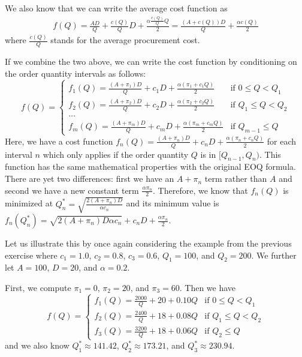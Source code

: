 \begin{solution}
We also know that we can write the average cost function as 
\begin{align*}
f(Q) = \frac{AD}{Q} + \frac{c(Q)}{Q} D + \frac{\alpha \frac{c(Q)}{Q}Q}{2} = \frac{(A+c(Q))D}{Q} + \frac{\alpha c(Q)}{2} 
\end{align*}
where $\frac{c(Q)}{Q}$ stands for the average procurement cost. 

If we combine the two above, we can write the cost function by conditioning on the order quantity intervals as follows:
\begin{equation*}
f(Q) = 
\begin{cases}
f_1(Q) = \frac{(A+\pi_1)D}{Q} + c_1 D + \frac{\alpha (\pi_1 + c_1 Q)}{2} & \text{if } 0 \leq Q < Q_1 \\
f_2(Q) = \frac{(A+\pi_2)D}{Q} + c_2 D + \frac{\alpha (\pi_2 + c_2 Q)}{2} & \text{if } Q_1 \leq Q < Q_2 \\
\ldots \\
f_m(Q) = \frac{(A+\pi_m)D}{Q} + c_m D + \frac{\alpha (\pi_m + c_m Q)}{2} & \text{if } Q_{m-1} \leq Q 
\end{cases}
\end{equation*}
Here, we have a cost function $f_n(Q) = \frac{(A+\pi_n)D}{Q} + c_n D + \frac{\alpha (\pi_n + c_n Q)}{2}$ for each interval $n$ which only applies if the order quantity $Q$ is in $[Q_{n-1},Q_n)$. This function has the same mathematical properties with the original EOQ formula. There are yet two differences: first we have an $A+\pi_n$ term rather than $A$ and second we have a new constant term $\frac{\alpha \pi_n}{2}$. Therefore, we know that $f_n(Q)$ is minimized at $Q^*_n=\sqrt{\frac{2(A+\pi_n)D}{\alpha c_n}}$ and its minimum value is $f_n(Q^*_n)=\sqrt{2(A+\pi_n)D\alpha c_n}+c_n D+\frac{\alpha \pi_n}{2}$.

Let us illustrate this by once again considering the example from the previous exercise where $c_1=1.0$, $c_2=0.8$, $c_3=0.6$, $Q_1=100$, and $Q_2=200$. We further let $A=100$, $D=20$, and $\alpha=0.2$. 

First, we compute $\pi_1=0$, $\pi_2=20$, and $\pi_3=60$. Then we have
\begin{equation*}
f(Q) = 
\begin{cases}
f_1(Q) = \frac{2000}{Q} + 20 + 0.10 Q & \text{if } 0 \leq Q < Q_1 \\
f_2(Q) = \frac{2400}{Q} + 18 + 0.08 Q & \text{if } Q_1 \leq Q < Q_2 \\
f_3(Q) = \frac{3200}{Q} + 18 + 0.06 Q & \text{if } Q_{2} \leq Q 
\end{cases}
\end{equation*}
and we also know $Q^*_1\approx 141.42$, $Q^*_2\approx 173.21$, and $Q^*_3\approx 230.94$. 


\end{solution}
